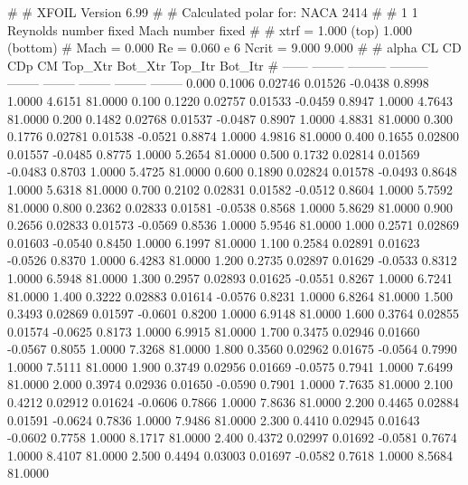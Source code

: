 #  
#       XFOIL         Version 6.99
#  
# Calculated polar for: NACA 2414                                       
#  
# 1 1 Reynolds number fixed          Mach number fixed         
#  
# xtrf =   1.000 (top)        1.000 (bottom)  
# Mach =   0.000     Re =     0.060 e 6     Ncrit =   9.000  9.000
#  
#   alpha    CL        CD       CDp       CM     Top_Xtr  Bot_Xtr  Top_Itr  Bot_Itr
#  ------ -------- --------- --------- -------- -------- -------- -------- --------
   0.000   0.1006   0.02746   0.01526  -0.0438   0.8998   1.0000   4.6151  81.0000
   0.100   0.1220   0.02757   0.01533  -0.0459   0.8947   1.0000   4.7643  81.0000
   0.200   0.1482   0.02768   0.01537  -0.0487   0.8907   1.0000   4.8831  81.0000
   0.300   0.1776   0.02781   0.01538  -0.0521   0.8874   1.0000   4.9816  81.0000
   0.400   0.1655   0.02800   0.01557  -0.0485   0.8775   1.0000   5.2654  81.0000
   0.500   0.1732   0.02814   0.01569  -0.0483   0.8703   1.0000   5.4725  81.0000
   0.600   0.1890   0.02824   0.01578  -0.0493   0.8648   1.0000   5.6318  81.0000
   0.700   0.2102   0.02831   0.01582  -0.0512   0.8604   1.0000   5.7592  81.0000
   0.800   0.2362   0.02833   0.01581  -0.0538   0.8568   1.0000   5.8629  81.0000
   0.900   0.2656   0.02833   0.01573  -0.0569   0.8536   1.0000   5.9546  81.0000
   1.000   0.2571   0.02869   0.01603  -0.0540   0.8450   1.0000   6.1997  81.0000
   1.100   0.2584   0.02891   0.01623  -0.0526   0.8370   1.0000   6.4283  81.0000
   1.200   0.2735   0.02897   0.01629  -0.0533   0.8312   1.0000   6.5948  81.0000
   1.300   0.2957   0.02893   0.01625  -0.0551   0.8267   1.0000   6.7241  81.0000
   1.400   0.3222   0.02883   0.01614  -0.0576   0.8231   1.0000   6.8264  81.0000
   1.500   0.3493   0.02869   0.01597  -0.0601   0.8200   1.0000   6.9148  81.0000
   1.600   0.3764   0.02855   0.01574  -0.0625   0.8173   1.0000   6.9915  81.0000
   1.700   0.3475   0.02946   0.01660  -0.0567   0.8055   1.0000   7.3268  81.0000
   1.800   0.3560   0.02962   0.01675  -0.0564   0.7990   1.0000   7.5111  81.0000
   1.900   0.3749   0.02956   0.01669  -0.0575   0.7941   1.0000   7.6499  81.0000
   2.000   0.3974   0.02936   0.01650  -0.0590   0.7901   1.0000   7.7635  81.0000
   2.100   0.4212   0.02912   0.01624  -0.0606   0.7866   1.0000   7.8636  81.0000
   2.200   0.4465   0.02884   0.01591  -0.0624   0.7836   1.0000   7.9486  81.0000
   2.300   0.4410   0.02945   0.01643  -0.0602   0.7758   1.0000   8.1717  81.0000
   2.400   0.4372   0.02997   0.01692  -0.0581   0.7674   1.0000   8.4107  81.0000
   2.500   0.4494   0.03003   0.01697  -0.0582   0.7618   1.0000   8.5684  81.0000
